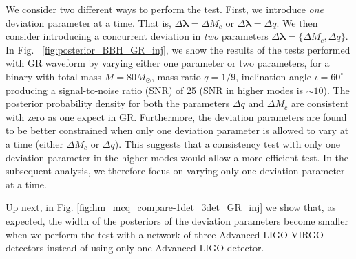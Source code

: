 \documentclass[prd,preprintnumbers,twocolumn,eqsecnum,floatfix,a4paper,nofootinbib,superscriptaddress]{revtex4}
\newcommand{\blambda}{\bm{\lambda}}
\begin{document}
We consider two different ways to perform the test. First, we introduce \emph{one} deviation parameter at a time. That is, $\Delta\blambda = {\Delta M_c}$ or $\Delta\blambda = {\Delta q}$. We then consider introducing a concurrent deviation in \emph{two} parameters $\Delta \blambda = \{\Delta M_c, \Delta q\}$. In Fig. 
~\ref{fig:posterior_BBH_GR_inj}, we show the results of the tests performed with GR waveform by varying either one parameter or two parameters, for a binary with total mass $M = 80M_{\odot}$, mass ratio $q=1/9$, inclination angle $ {\iota}=60^{\circ} $ producing a signal-to-noise ratio  (SNR)  of 25 (SNR in higher modes is $\sim 10$). The posterior probability density for both the parameters $\Delta q$ and $\Delta M_c$ are consistent with zero as one expect in GR. Furthermore, the deviation parameters are found to be better constrained when only one deviation parameter is allowed to vary at a time (either $\Delta M_c$ or $\Delta q$). This suggests that a consistency test with only one deviation parameter in the higher modes would allow a more efficient test. In the subsequent analysis, we therefore focus on varying only one deviation parameter at a time. 

Up next, in Fig. \ref{fig:hm_mcq_compare-1det_3det_GR_inj} we show that, as expected, the width of the posteriors of the deviation parameters become smaller when we perform the test with a network of three Advanced LIGO-VIRGO detectors instead of using only one Advanced LIGO detector. 

 
\end{document}

